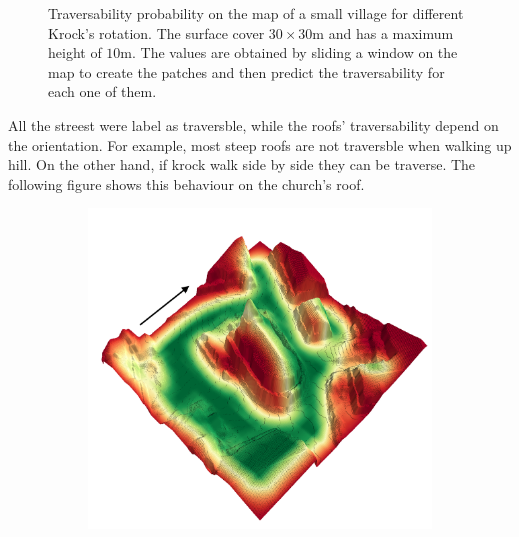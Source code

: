 \documentclass[../document.tex]{subfiles}
\begin{document}
\begin{figure}[H]
\begin{subfigure}[b]{0.45\textwidth}
  \end{subfigure}
  \caption{Traversability probability on the map of a small village for different Krock's rotation. The surface cover $30\times 30$m and has a maximum height of $10$m. The values are obtained by sliding a window on the map to create the patches and then predict the traversability for each one of them.}
  \end{figure}
  All the streest were label as traversble, while the roofs' traversability depend on the orientation. For example, most steep roofs are not traversble when walking up hill. On the other hand, if krock walk side by side they can be traverse. The following figure shows this behaviour on the church's roof.
  \begin{figure}[H]
    \centering
    \begin{subfigure}[b]{0.45\textwidth}
      \includegraphics[width=\linewidth]{../img/4/traversability/sullens-church/-270.png} 
    \end{subfigure}
    \begin{subfigure}[b]{0.45\textwidth}

\end{subfigure}
\end{figure}
\end{document}
